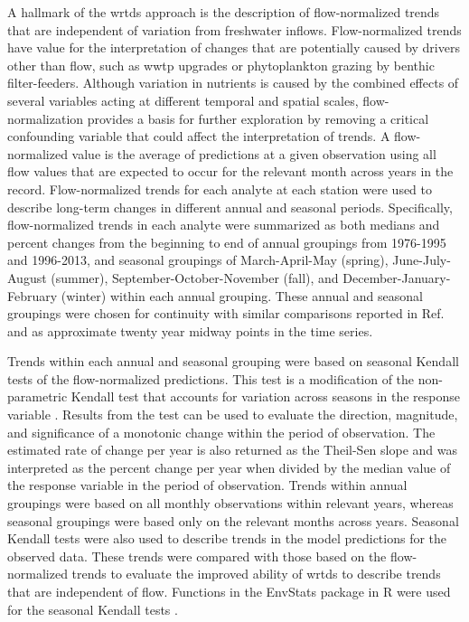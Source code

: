 \documentclass[journal = esthag, manuscript = article]{achemso}\usepackage[]{graphicx}\usepackage[]{color}
\begin{document}
A hallmark of the \ac{wrtds} approach is the description of flow-normalized trends that are independent of variation from freshwater inflows.  Flow-normalized trends have value for the interpretation of changes that are potentially caused by drivers other than  flow, such as \ac{wwtp} upgrades or phytoplankton grazing by benthic filter-feeders\cite{Beck15}. Although variation in nutrients is caused by the combined effects of several variables acting at different temporal and spatial scales, flow-normalization provides a basis for further exploration by removing a critical confounding variable that could affect the interpretation of trends. A flow-normalized value is the average of predictions at a given observation using all flow values that are expected to occur for the relevant month across years in the record.  Flow-normalized trends for each analyte at each station were used to describe long-term changes in different annual and seasonal periods.  Specifically, flow-normalized trends in each analyte were summarized as both medians and percent changes from the beginning to end of annual groupings from 1976-1995 and 1996-2013, and seasonal groupings of March-April-May (spring), June-July-August (summer), September-October-November (fall), and December-January-February (winter) within each annual grouping. These annual and seasonal groupings were chosen for continuity with similar comparisons reported in Ref.~ and as approximate twenty year midway points in the time series.  

Trends within each annual and seasonal grouping were based on seasonal Kendall tests of the flow-normalized predictions. This test is a modification of the non-parametric Kendall test that accounts for variation across seasons in the response variable \cite{Hirsch82}.  Results from the test can be used to evaluate the direction, magnitude, and significance of a monotonic change within the period of observation.  The estimated rate of change per year is also returned as the Theil-Sen slope and was interpreted as the percent change per year when divided by the median value of the response variable in the period of observation.\cite{Jassby08}  Trends within annual groupings were based on all monthly observations within relevant years, whereas seasonal groupings were based only on the relevant months across years.  Seasonal Kendall tests were also used to describe trends in the model predictions for the observed data.  These trends were compared with those based on the flow-normalized trends to evaluate the improved ability of \ac{wrtds} to describe trends that are independent of flow.  Functions in the EnvStats package in R were used for the seasonal Kendall tests \cite{Millard13}. 
\end{document}
